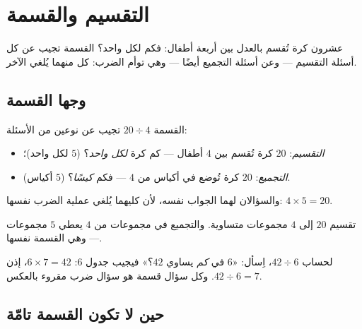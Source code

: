 \chapter{التقسيم والقسمة}\label{ch:g3:division}

عشرون كرة تُقسم بالعدل بين أربعة أطفال: فكم لكل واحد؟ القسمة
تجيب عن كل أسئلة التقسيم --- وعن أسئلة التجميع أيضًا --- وهي توأم
الضرب: كل منهما يُلغي
الآخر.

\section{وجها القسمة}

\begin{definition}[القسمة]\label{def:g3:division:def}
القسمة $20 \div 4$ تجيب عن نوعين من الأسئلة:
\begin{itemize}
  \item \emph{التقسيم}: $20$ كرة تُقسم بين $4$ أطفال ---
        كم كرة \emph{لكل واحد}؟ ($5$ لكل واحد)؛
  \item \emph{التجميع}: $20$ كرة تُوضع في أكياس من $4$ --- فكم
        \emph{كيسًا}؟ ($5$ أكياس).
\end{itemize}
والسؤالان لهما الجواب نفسه، لأن كليهما يُلغي عملية الضرب
نفسها: $4 \times 5 = 20$.
\end{definition}

\begin{omfigure}

{\small تقسيم $20$ إلى $4$ مجموعات متساوية. والتجميع في مجموعات
من $4$ يعطي $5$ مجموعات --- وهي القسمة نفسها.}
\end{omfigure}

\begin{method}\label{met:g3:division:tables}
لحساب $42 \div 6$، اِسأل: «$6$ في \emph{كم} يساوي $42$؟»
فيجيب جدول $6$: $6 \times 7 = 42$، إذن $42 \div 6 = 7$.
وكل سؤال قسمة هو سؤال ضرب مقروء
بالعكس.
\end{method}

\section{حين لا تكون القسمة تامّة}

